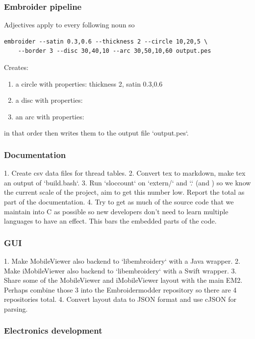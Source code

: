 \documentclass[a4paper, 11pt]{report}
\begin{document}
\subsubsection{Embroider pipeline}

Adjectives apply to every following noun so

\begin{verbatim}
embroider --satin 0.3,0.6 --thickness 2 --circle 10,20,5 \
    --border 3 --disc 30,40,10 --arc 30,50,10,60 output.pes
\end{verbatim}

Creates:

\begin{enumerate}
\item a circle with properties: thickness 2, satin 0.3,0.6
\item a disc with properties: 
\item an arc with properties:
\end{enumerate}

in that order then writes them to the output file `output.pes`.

\subsubsection{Documentation}

1. Create csv data files for thread tables.
2. Convert tex to markdown, make tex an output of `build.bash`.
3. Run `sloccount` on `extern/` and `.` (and ) so we know the current scale
   of the project, aim to get this number low. Report the total as part of
   the documentation.
4. Try to get as much of the source code that we maintain into C as possible
   so new developers don't need to learn multiple languages to have an effect.
   This bars the embedded parts of the code. 

\subsubsection{GUI}

1. Make MobileViewer also backend to `libembroidery` with a Java wrapper.
2. Make iMobileViewer also backend to `libembroidery` with a Swift wrapper.
3. Share some of the MobileViewer and iMobileViewer layout with the main
   EM2. Perhaps combine those 3 into the Embroidermodder repository so there
   are 4 repositories total.
4. Convert layout data to JSON format and use cJSON for parsing.

\subsubsection{Electronics development}
\end{document}
